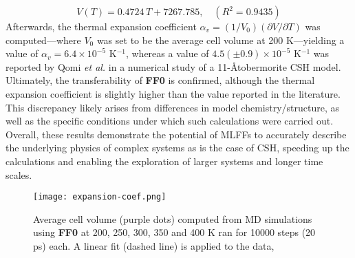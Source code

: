 \begin{equation}
    \label{eq:thermal-expansion}
    V(T) = 0.4724\,T + 7267.785, \quad (R^2 = 0.9435)
\end{equation}
Afterwards, the thermal expansion coefficient $\alpha_v=(1/V_0)(\partial V/\partial T)$ was computed---where $V_0$ 
was set to be the average cell volume at 200 K---yielding a value of $\alpha_v = 6.4 \times 10^{-5}$ K$^{-1}$, whereas a value of $4.5(\pm 0.9) \times 10^{-5}$ K$^{-1}$ was reported by Qomi \emph{et al.}\supercite{AbdolhosseiniQomi2015} in a numerical study of a 11-\AA tobermorite CSH model. 
Ultimately, the transferability of \textbf{FF0} is confirmed, although the thermal expansion coefficient is slightly higher than the value reported in the literature. This discrepancy likely arises from differences in model chemistry/structure, as well as the specific conditions under which such calculations were carried out. Overall, these results demonstrate the potential of MLFFs to accurately describe the underlying physics of complex systems as is the case of CSH, speeding up the calculations and enabling the exploration of larger systems and longer time scales.
\begin{figure}[H]
    \centering
    \texttt{[image: expansion-coef.png]}
    \caption{
    Average cell volume (purple dots) computed from MD simulations using \textbf{FF0} at 200, 250, 300, 350 and 400 K ran for 10000 steps (20 ps) each. A linear fit (dashed line) is applied to the data, 
    }
    \label{expansion-coef}
\end{figure}





